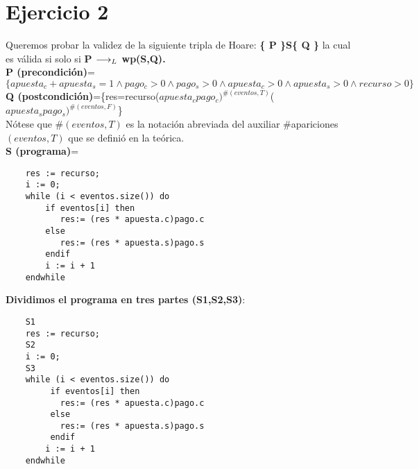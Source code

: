 \documentclass[10pt,a4paper]{article}
\begin{document}
\section{Ejercicio 2}
\begin{flushleft}
Queremos probar  la validez de la siguiente tripla de Hoare:
\textbf{\{ P \}S\{ Q \}} la cual es válida si solo si \textbf{{P $\longrightarrow _L$ wp(S,Q)}.}\\                                  
\vspace{3mm}
\textbf{P (precondición)}=$\{ apuesta_c + apuesta_s =1 \wedge pago_c>0 \wedge pago_s>0 \wedge apuesta_c>0 \wedge apuesta_s>0 \wedge recurso>0\}$\\
\vspace{3mm}
\textbf{Q (postcondición)}=\{res=recurso($apuesta_cpago_c)^{\#(eventos,T)}$($apuesta_spago_s)^{\#(eventos,F)}$\}\\
\vspace{3mm}
Nótese que \#$(eventos, T)$ es la notación abreviada del auxiliar {\normalfont\ttfamily\#apariciones$(eventos, T)$} 
que se definió en la teórica. \\
\vspace{3mm}
\textbf{S (programa)}=
\begin{lstlisting}
	res := recurso;
	i := 0;
	while (i < eventos.size()) do
	    if eventos[i] then
		   res:= (res * apuesta.c)pago.c
		else
		   res:= (res * apuesta.s)pago.s
		endif
		i := i + 1
	endwhile
\end{lstlisting} 

\vspace{3mm}
\textbf{Dividimos el programa en tres partes (S1,S2,S3)}:\\
\begin{lstlisting}
	S1
	res := recurso;
	S2
	i := 0;
	S3
	while (i < eventos.size()) do
	     if eventos[i] then
		   res:= (res * apuesta.c)pago.c
		 else
		   res:= (res * apuesta.s)pago.s
		 endif
		i := i + 1
	endwhile
		\end{lstlisting} 


\end{flushleft}
\end{document}
